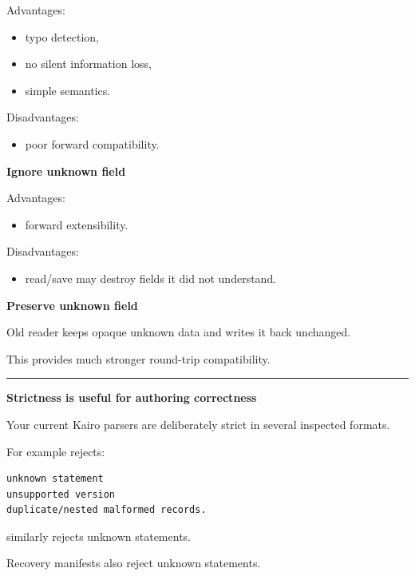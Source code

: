 Advantages:

\begin{itemize}
\tightlist
\item
  typo detection,
\item
  no silent information loss,
\item
  simple semantics.
\end{itemize}

Disadvantages:

\begin{itemize}
\tightlist
\item
  poor forward compatibility.
\end{itemize}

\textbf{Ignore unknown field}

Advantages:

\begin{itemize}
\tightlist
\item
  forward extensibility.
\end{itemize}

Disadvantages:

\begin{itemize}
\tightlist
\item
  read/save may destroy fields it did not understand.
\end{itemize}

\textbf{Preserve unknown field}

Old reader keeps opaque unknown data and writes it back unchanged.

This provides much stronger round-trip compatibility.

\begin{center}\rule{0.5\linewidth}{0.5pt}\end{center}

\textbf{Strictness is useful for authoring correctness}

Your current Kairo parsers are deliberately strict in several inspected formats.

For example  rejects:

\begin{verbatim}
unknown statement
unsupported version
duplicate/nested malformed records.
\end{verbatim}

 similarly rejects unknown statements.

Recovery manifests also reject unknown statements.


